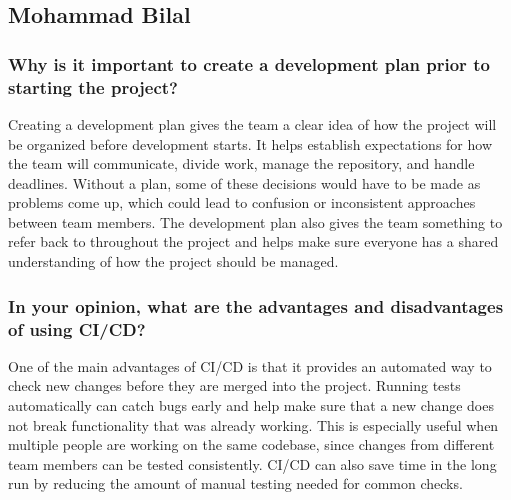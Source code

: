 \documentclass{article}
\begin{document}

\subsection*{Mohammad Bilal}

\subsubsection*{Why is it important to create a development plan prior to starting the project?}

Creating a development plan gives the team a clear idea of how the project will be organized
before development starts. It helps establish expectations for how the team will communicate,
divide work, manage the repository, and handle deadlines. Without a plan, some of these decisions
would have to be made as problems come up, which could lead to confusion or inconsistent approaches
between team members. The development plan also gives the team something to refer back to throughout
the project and helps make sure everyone has a shared understanding of how the project should be managed.

\subsubsection*{In your opinion, what are the advantages and disadvantages of using CI/CD?}

One of the main advantages of CI/CD is that it provides an automated way to check new changes
before they are merged into the project. Running tests automatically can catch bugs early and
help make sure that a new change does not break functionality that was already working. This is
especially useful when multiple people are working on the same codebase, since changes from different
team members can be tested consistently. CI/CD can also save time in the long run by reducing the
amount of manual testing needed for common checks.
\end{document}
